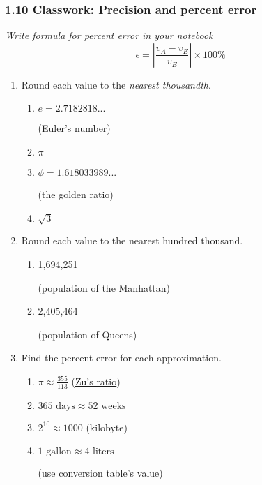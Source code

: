 

\fancyhead[LE]{\thepage}



\subsubsection*{1.10 Classwork: Precision and percent error}
\emph{Write formula for percent error in your notebook}
$$\epsilon = \left|\frac{v_A-v_E}{v_E}\right| \times 100\%$$
\begin{enumerate}
\item Round each value to the \emph{nearest thousandth}.
  \begin{multicols}{2}
    \begin{enumerate}
      \item $e=2.7182818...$ \par (Euler's number)
      \item $\pi$
      \item $\phi = 1.618033989...$ \par (the golden ratio)
      \item $\sqrt{3}$
    \end{enumerate}
  \end{multicols} \bigskip 

\item Round each value to the nearest hundred thousand.
  \begin{multicols}{2}
    \begin{enumerate}
      \item 1,694,251 \par \bigskip (population of the Manhattan)
      \item 2,405,464 \par \bigskip (population of Queens)
    \end{enumerate}
  \end{multicols}

\item Find the percent error for each approximation.
  \begin{multicols}{2}
    \begin{enumerate}[itemsep=4cm]
      \item $\displaystyle \pi \approx \frac{355}{113}$ (\href{https://en.wikipedia.org/wiki/Zu_Chongzhi}{Zu's ratio})
      \item $365 \text{ days} \approx 52 \text{ weeks}$
      \item $2^{10} 
      \approx 1000$ (kilobyte)
      \item $1 \text{ gallon} \approx 4 \text{ liters}$ \par (use conversion table's value)    
    \end{enumerate}
  \end{multicols}


\end{enumerate}
